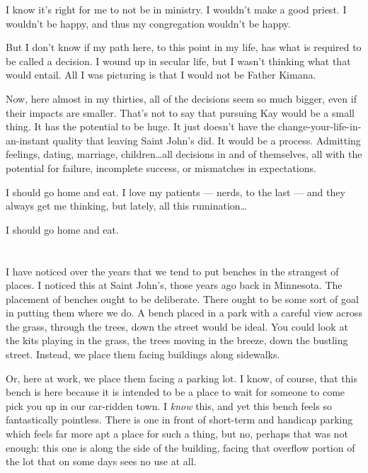 I know it's right for me to not be in ministry. I wouldn't make a good priest. I wouldn't be happy, and thus my congregation wouldn't be happy.

But I don't know if my path here, to this point in my life, has what is required to be called a decision. I wound up in secular life, but I wasn't thinking what that would entail. All I was picturing is that I would not be Father Kimana.

Now, here almost in my thirties, all of the decisions seem so much bigger, even if their impacts are smaller. That's not to say that pursuing Kay would be a small thing. It has the potential to be huge. It just doesn't have the change-your-life-in-an-instant quality that leaving Saint John's did. It would be a process. Admitting feelings, dating, marriage, children\ldots all decisions in and of themselves, all with the potential for failure, incomplete success, or mismatches in expectations.

I should go home and eat. I love my patients --- nerds, to the last --- and they always get me thinking, but lately, all this rumination\ldots{}

I should go home and eat.

\section{}

I have noticed over the years that we tend to put benches in the strangest of places. I noticed this at Saint John's, those years ago back in Minnesota. The placement of benches ought to be deliberate. There ought to be some sort of goal in putting them where we do. A bench placed in a park with a careful view across the grass, through the trees, down the street would be ideal. You could look at the kits playing in the grass, the trees moving in the breeze, down the bustling street. Instead, we place them facing buildings along sidewalks.

Or, here at work, we place them facing a parking lot. I know, of course, that this bench is here because it is intended to be a place to wait for someone to come pick you up in our car-ridden town. I \emph{know} this, and yet this bench feels so fantastically pointless. There is one in front of short-term and handicap parking which feels far more apt a place for such a thing, but no, perhaps that was not enough: this one is along the side of the building, facing that overflow portion of the lot that on some days sees no use at all.

